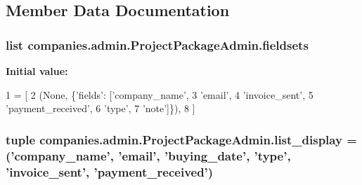 \subsection{Member Data Documentation}
\hypertarget{classcompanies_1_1admin_1_1_project_package_admin_affeb3f87ea2cccc9766aa6b340c93a7d}{
\subsubsection[{fieldsets}]{\setlength{\rightskip}{0pt plus 5cm}list companies.\-admin.\-Project\-Package\-Admin.\-fieldsets\hspace{0.3cm}{\ttfamily [static]}}}\label{classcompanies_1_1admin_1_1_project_package_admin_affeb3f87ea2cccc9766aa6b340c93a7d}
{\bfseries Initial value\-:}
\begin{DoxyCode}
1 = [
2         (\textcolor{keywordtype}{None}, \{\textcolor{stringliteral}{'fields'}: [\textcolor{stringliteral}{'company\_name'},
3                            \textcolor{stringliteral}{'email'},
4                            \textcolor{stringliteral}{'invoice\_sent'},
5                            \textcolor{stringliteral}{'payment\_received'},
6                            \textcolor{stringliteral}{'type'},
7                            \textcolor{stringliteral}{'note'}]\}),
8     ]
\end{DoxyCode}
\hypertarget{classcompanies_1_1admin_1_1_project_package_admin_a26501589dcd99524d1a65101f4c35940}{
\subsubsection[{list\-\_\-display}]{\setlength{\rightskip}{0pt plus 5cm}tuple companies.\-admin.\-Project\-Package\-Admin.\-list\-\_\-display = ('company\-\_\-name', 'email', 'buying\-\_\-date', 'type', 'invoice\-\_\-sent', 'payment\-\_\-received')\hspace{0.3cm}{\ttfamily [static]}}}\label{classcompanies_1_1admin_1_1_project_package_admin_a26501589dcd99524d1a65101f4c35940}
